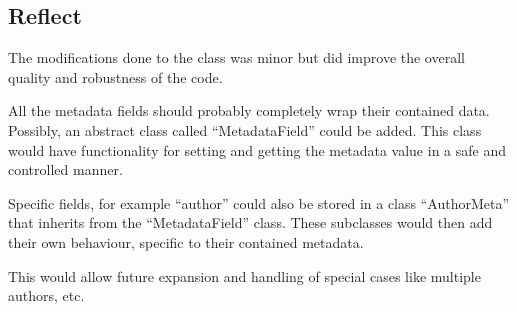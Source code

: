 \subsection{Reflect}\label{task-1c-reflect}
The modifications done to the class was minor but did improve the overall
quality and robustness of the code.

All the metadata fields should probably completely wrap their contained data. 
Possibly, an abstract class called ``MetadataField'' could be added. This class
would have functionality for setting and getting the metadata value in a safe
and controlled manner.

Specific fields, for example ``author'' could also be stored in a class
``AuthorMeta'' that inherits from the ``MetadataField'' class. These subclasses
would then add their own behaviour, specific to their contained metadata.

This would allow future expansion and handling of special cases like multiple
authors, etc.
